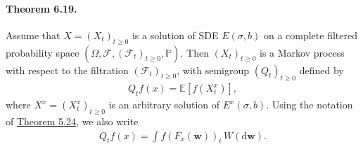 \documentclass{article}
\numberwithin{equation}{section}
\newcommand{\E}{\mathbb{E}}
\newcommand{\bfw}{\mathbf{w}}
\renewcommand{\P}{\mathbb{P}}
\renewcommand{\d}{\mathrm{d}}
\theoremstyle{plain}
\theoremstyle{definition}
\begin{document}
\paragraph{Theorem 6.19.\label{thm:6.19}} Assume that $X=(X_t)_{t\geq 0}$ is a solution of SDE $E(\sigma,b)$ on a complete filtered probability space $(\Omega,\mathscr{F},(\mathscr{F}_t)_{t\geq 0},\P)$. Then $(X_t)_{t\geq 0}$ is a Markov process with respect to the filtration $(\mathscr{F}_t)_{t\geq 0}$, with semigroup $(Q_t)_{t\geq 0}$ defined by
\begin{align*}
	Q_tf(x) = \E\left[f(X_t^x)\right],
\end{align*}
where $X^x=(X_t^x)_{t\geq 0}$ is an arbitrary solution of $E^x(\sigma,b)$. Using the notation of \hyperref[thm:5.24]{Theorem 5.24}, we also write
\begin{align*}
	Q_tf(x) = \int f(F_x(\bfw))_t\,W(\d\bfw).\label{eq:6.11}\tag{6.11}
\end{align*}
\end{document}
